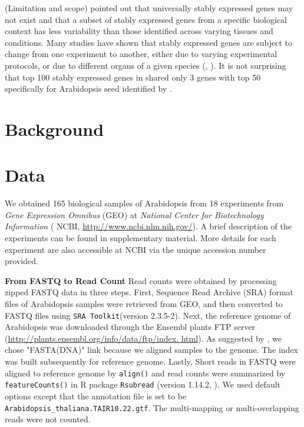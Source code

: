 \documentclass[11pt, a4paper]{article}
\begin{document}
(Limitation and scope) \cite{hruz2011refgenes} pointed out that universally
stably expressed genes may not exist and that a subset of stably expressed
genes from a specific biological context has less variability than those
identified across varying tissues and conditions. Many studies have shown that
stably expressed genes are subject to change from one experiment to another,
either due to varying experimental protocols, or due to different organs of a
given species (\cite{reid2006optimized}, \cite{hong2010identification}).  It
is not surprising that top 100 stably expressed genes in
\cite{czechowski2005genome} shared only 3 genes with top 50  specifically for
Arabidopsis seed identified by \cite{dekkers2012identification}.


\section{Background}

\section{Data}
 We obtained 165 biological samples of Arabidopsis  from 18 experiments from \textit{Gene Expression Omnibus} (GEO) at \textit{National Center for Biotechnology Information}  ( NCBI, \url{http://www.ncbi.nlm.nih.gov/}).  A brief description of the experiments can be found in supplementary material. More details for each experiment are also accessible at NCBI via the unique accession number provided.
 
\textbf{From FASTQ to Read Count} Read counts were obtained by processing
zipped FASTQ data in three steps. First, Sequence Read Archive (SRA) format
files of Arabidopsis samples were retrieved from GEO, and then converted to
FASTQ files using \verb"SRA Toolkit"(version 2.3.5-2). Next, the reference
genome of Arabidopsis was downloaded  through the Ensembl plants FTP server
(\url{http://plants.ensembl.org/info/data/ftp/index. html}). As suggested by
\cite{anders2013count},  we chose "FASTA(DNA)" link because we aligned samples 
to the genome.
The index  was built subsequently for reference genome.  Lastly, Short reads
in FASTQ were  aligned to reference genome by  \verb"align()" and read counts
were summarized by \verb"featureCounts()" in R package \verb"Rsubread"
(version 1.14.2,  \cite{liao2013subread}). We used default options except that
the annotation file is set to be \verb"Arabidopsis_thaliana.TAIR10.22.gtf".
The multi-mapping or multi-overlapping reads were not counted.  
\end{document}
